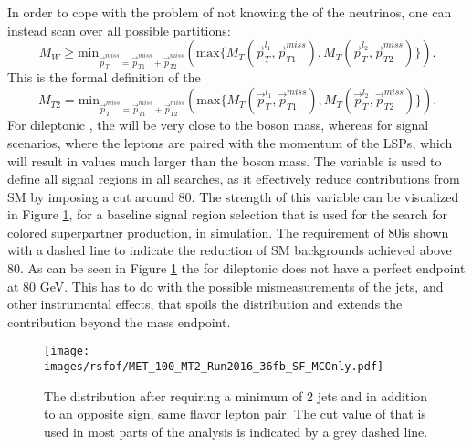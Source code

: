 In order to cope with the problem of not knowing the \pt of the neutrinos, one can instead scan over all possible \ptmiss partitions: 
\begin{equation}
M_{W}\geq \mathrm{min}_{\vec{p}_{T}^{miss}=\vec{p}_{T1}^{miss}+\vec{p}_{T2}^{miss}}\left( \mathrm{max}\{M_{T}\left(\vec{p}_{T}^{l_{1}},\vec{p}_{T1}^{miss}\right), M_{T}\left(\vec{p}_{T}^{l_{2}},\vec{p}_{T2}^{miss}\right)\}\right).
\end{equation}
This is the formal definition of the \mttwo 
\begin{equation}
M_{T2}= \mathrm{min}_{\vec{p}_{T}^{miss}=\vec{p}_{T1}^{miss}+\vec{p}_{T2}^{miss}}\left( \mathrm{max}\{M_{T}\left(\vec{p}_{T}^{l_{1}},\vec{p}_{T1}^{miss}\right), M_{T}\left(\vec{p}_{T}^{l_{2}},\vec{p}_{T2}^{miss}\right)\}\right).
\end{equation}
For dileptonic \ttbar, the \mttwo will be very close to the \PW boson mass, whereas for signal scenarios, where the leptons are paired with the momentum of the LSPs, which will result in values much larger than the \PW boson mass. 
The \mttwo variable is used to define all signal regions in all searches, as it effectively reduce contributions from SM \ttbar by imposing a cut around 80\GeV.
The strength of this variable can be visualized in Figure \ref{fig:mttwoSim}, for a baseline signal region selection that is used for the search for colored superpartner production, in simulation. 
The \mttwo requirement of 80\GeV is shown with a dashed line to indicate the reduction of SM backgrounds achieved above 80\GeV. 
As can be seen in Figure \ref{fig:mttwoSim} the \mttwo for dileptonic \ttbar does not have a perfect endpoint at 80 GeV. 
This has to do with the possible mismeasurements of the jets, and other instrumental effects, that spoils the distribution and extends the \ttbar contribution beyond the \PW mass endpoint.
\begin{figure}[htbp!]
\begin{center}
    \texttt{[image: images/rsfof/MET\_100\_MT2\_Run2016\_36fb\_SF\_MCOnly.pdf]}
    \caption{The \mttwo distribution after requiring a minimum of 2 jets and \GeV in addition to an opposite sign, same flavor lepton pair. 
The cut value of \GeV that is used in most parts of the analysis is indicated by a grey dashed line.}
\label{fig:mttwoSim}
\end{center}
\end{figure}
